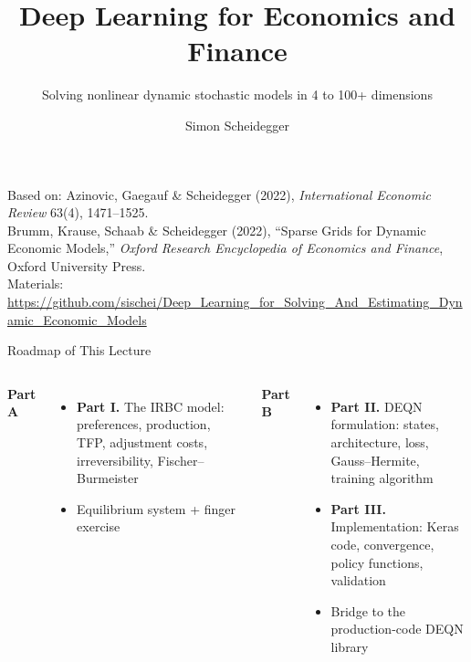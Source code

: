 \documentclass[aspectratio=169,11pt]{beamer}
\title[Deep Learning for Dynamic Economic Models]
{Deep Learning for Economics and Finance}
\subtitle{Solving nonlinear dynamic stochastic models in 4 to 100+ dimensions}
\author{Simon Scheidegger}
\institute[HEC Lausanne]{HEC, University of Lausanne}
\date{}
\begin{document}
\newcommand{\exercisepause}{%
  \tikz[baseline=(X.base)]{\node[fill=darkgreen!80!black, text=white,
  rounded corners=2pt, inner sep=3pt, font=\scriptsize\bfseries](X){PAUSE --- 5 min};}}



{
\begin{frame}
\titlepage
\vspace{-0.4cm}
\begin{center}
{\footnotesize Based on: Azinovic, Gaegauf \& Scheidegger (2022), \emph{International Economic Review} 63(4), 1471--1525.\\
Brumm, Krause, Schaab \& Scheidegger (2022), ``Sparse Grids for Dynamic Economic Models,'' \emph{Oxford Research Encyclopedia of Economics and Finance}, Oxford University Press.}\\[4pt]
{\footnotesize Materials: \url{https://github.com/sischei/Deep_Learning_for_Solving_And_Estimating_Dynamic_Economic_Models}}
\end{center}
\end{frame}
}

\begin{frame}{Roadmap of This Lecture}
\vspace{0.2em}
\begin{columns}[T]
\textbf{Part A}
\begin{itemize}
    \item \textbf{Part I.} The IRBC model: preferences, production, TFP, adjustment costs, irreversibility, Fischer--Burmeister
    \item Equilibrium system + finger exercise
\end{itemize}

\textbf{Part B}
\begin{itemize}
    \item \textbf{Part II.} DEQN formulation: states, architecture, loss, Gauss--Hermite, training algorithm
    \item \textbf{Part III.} Implementation: Keras code, convergence, policy functions, validation
    \item Bridge to the production-code DEQN library
\end{itemize}
\end{columns}
\end{frame}
\end{document}
